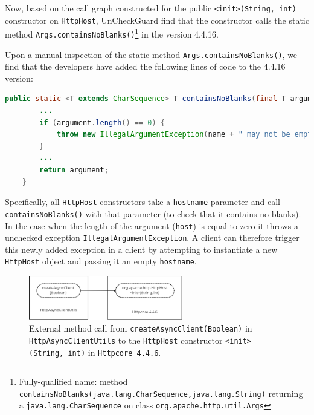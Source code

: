 Now, based on the call graph constructed for the public \texttt{<init>(String, int)} constructor on \texttt{HttpHost}, UnCheckGuard find that the constructor calls the static method \texttt{Args.containsNoBlanks()}\footnote{Fully-qualified name: method \texttt{containsNoBlanks(java.lang.CharSequence,java.lang.String)} returning a \texttt{java.lang.CharSequence} on class \texttt{org.apache.http.util.Args} } in the version 4.4.16.


Upon a manual inspection of the static method \texttt{Args.containsNoBlanks()}, we find that the developers have added the following lines of code to the 4.4.16 version:

\begin{lstlisting}[language=Java]
  public static <T extends CharSequence> T containsNoBlanks(final T argument, final String name) {
        ...
        if (argument.length() == 0) {
            throw new IllegalArgumentException(name + " may not be empty");
        }
        ...
        return argument;
    }
\end{lstlisting}

Specifically, all \texttt{HttpHost} constructors take a \texttt{hostname} parameter and call \texttt{containsNoBlanks()}
with that parameter (to check that it contains no blanks). In the case when the length of the argument (\texttt{host}) is equal to zero it throws a unchecked exception \texttt{IllegalArgumentException}. A client can therefore trigger this newly added exception
in a client by attempting to instantiate a new \texttt{HttpHost} object and passing it an empty
\texttt{hostname}.

\begin{figure}[htbp]
    \centering
    \includegraphics[width=0.6\textwidth]{diagram/httpcore6.png}
    \caption{External method call from \texttt{createAsyncClient(Boolean)} in \texttt{HttpAsyncClientUtils} to the \texttt{HttpHost} constructor \texttt{<init>(String, int)} in \texttt{Httpcore 4.4.6}.}
    \label{fig:httpcore6}
\end{figure}

